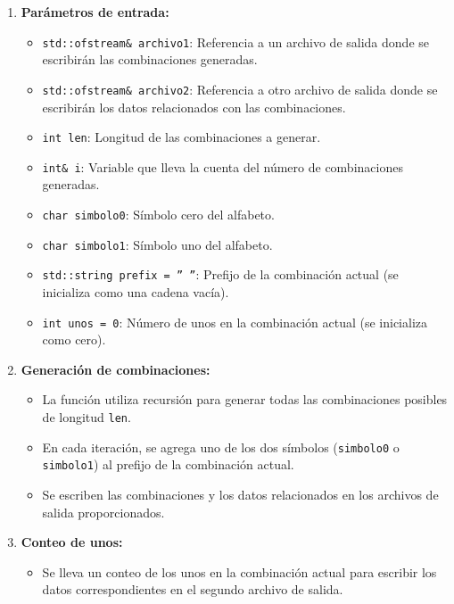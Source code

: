 \documentclass{article}
\begin{document}
        \begin{enumerate}
            \item \textbf{Parámetros de entrada:}
                \begin{itemize}
                    \item \texttt{std::ofstream\& archivo1}: Referencia a un archivo de salida donde se escribirán las combinaciones
                    generadas.
                    \item \texttt{std::ofstream\& archivo2}: Referencia a otro archivo de salida donde se escribirán los datos
                    relacionados con las combinaciones.
                    \item \texttt{int len}: Longitud de las combinaciones a generar.
                    \item \texttt{int\& i}: Variable que lleva la cuenta del número de combinaciones generadas.
                    \item \texttt{char simbolo0}: Símbolo cero del alfabeto.
                    \item \texttt{char simbolo1}: Símbolo uno del alfabeto.
                    \item \texttt{std::string prefix = '' ''}: Prefijo de la combinación actual (se inicializa como una cadena vacía).
                    \item \texttt{int unos = 0}: Número de unos en la combinación actual (se inicializa como cero).
                \end{itemize}

            \item \textbf{Generación de combinaciones:}
                \begin{itemize}
                    \item La función utiliza recursión para generar todas las combinaciones posibles de longitud \texttt{len}.
                    \item En cada iteración, se agrega uno de los dos símbolos (\texttt{simbolo0} o \texttt{simbolo1}) al prefijo de
                    la combinación actual.
                    \item Se escriben las combinaciones y los datos relacionados en los archivos de salida proporcionados.
                \end{itemize}

            \item \textbf{Conteo de unos:}
                \begin{itemize}
                    \item Se lleva un conteo de los unos en la combinación actual para escribir los datos correspondientes en el
                    segundo archivo de salida.
                \end{itemize}
        \end{enumerate}
\end{document}
